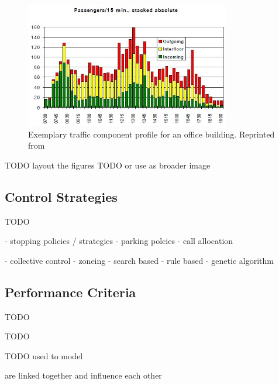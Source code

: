 \begin{figure}[hbt]
	\centering
	\includegraphics[width=0.8\textwidth, keepaspectratio]{resources/traffictimes}
	\caption{\label{fig:sota:traffictimes} Exemplary traffic component profile for an office building.
	Reprinted from \textcite[][p.~14]{siikonen1997models}}
\end{figure}

TODO layout the figures
TODO or use \textcite[][p.~12]{sorsa2005destination} as broader image 

\subsection{Control Strategies}
TODO

\autocite[][pp.~3--4,10]{beers2015arrivals}
- stopping policies / strategies
- parking polcies
- call allocation

\autocite[][pp.~3--6]{axelsson2013strategies}
- collective control
- zoneing
- search based
- rule based
- genetic algorithm




\subsection{Performance Criteria}

TODO

TODO
\autocite[][p.~10]{beers2015arrivals}
\autocite[][p.~7]{hakonen2003simulation}
\autocite[][pp.8-9]{siikonen1997models}
\autocite[][p.~194]{unger2015aufzuege}

TODO used to model

are linked together and influence each other

